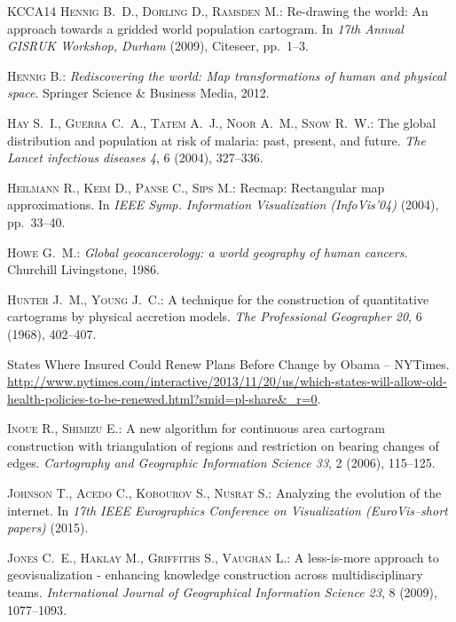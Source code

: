 \documentclass{egpubl}
\begin{document}
\begin{thebibliography}{\uppercase{KCCA{\etalchar{*}}14}}
\textsc{Hennig B.~D., Dorling D., Ramsden M.}:
\newblock Re-drawing the world: An approach towards a gridded world population
  cartogram.
\newblock In \emph{17th Annual GISRUK Workshop, Durham} (2009), Citeseer,
  pp.~1--3.

\textsc{Hennig B.}:
\newblock \emph{Rediscovering the world: Map transformations of human and
  physical space}.
\newblock Springer Science \& Business Media, 2012.

\textsc{Hay S.~I., Guerra C.~A., Tatem A.~J., Noor A.~M., Snow R.~W.}:
\newblock The global distribution and population at risk of malaria: past,
  present, and future.
\newblock \emph{The Lancet infectious diseases 4}, 6 (2004), 327--336.

\textsc{Heilmann R., Keim D., Panse C., Sips M.}:
\newblock Recmap: Rectangular map approximations.
\newblock In \emph{IEEE Symp. Information Visualization (InfoVis'04)} (2004),
  pp.~33--40.

\textsc{Howe G.~M.}:
\newblock \emph{Global geocancerology: a world geography of human cancers}.
\newblock Churchill Livingstone, 1986.

\textsc{Hunter J.~M., Young J.~C.}:
\newblock A technique for the construction of quantitative cartograms by
  physical accretion models.
\newblock \emph{The Professional Geographer 20}, 6 (1968), 402--407.

{States Where Insured Could Renew Plans Before Change by Obama -- NYTimes}.
\newblock
  \url{http://www.nytimes.com/interactive/2013/11/20/us/which-states-will-allow-old-health-policies-to-be-renewed.html?smid=pl-share&_r=0}.

\textsc{Inoue R., Shimizu E.}:
\newblock A new algorithm for continuous area cartogram construction with
  triangulation of regions and restriction on bearing changes of edges.
\newblock \emph{Cartography and Geographic Information Science 33}, 2 (2006),
  115--125.

\textsc{Johnson T., Acedo C., Kobourov S., Nusrat S.}:
\newblock Analyzing the evolution of the internet.
\newblock In \emph{17th IEEE Eurographics Conference on Visualization
  (EuroVis--short papers)} (2015).

\textsc{Jones C.~E., Haklay M., Griffiths S., Vaughan L.}:
\newblock A less-is-more approach to geovisualization - enhancing knowledge
  construction across multidisciplinary teams.
\newblock \emph{International Journal of Geographical Information Science 23},
  8 (2009), 1077--1093.


\end{thebibliography}
\end{document}
